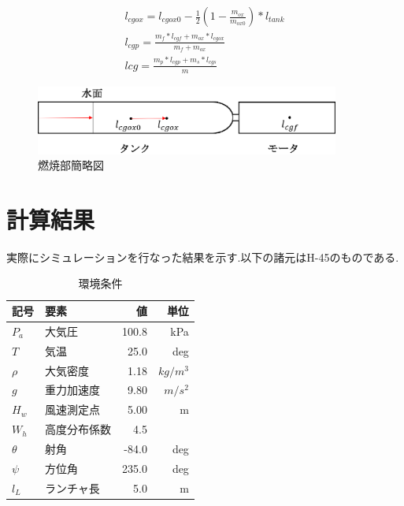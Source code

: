 \documentclass[a4paper]{jarticle}
\begin{document}
\begin{eqnarray}
  l_{cgox} = l_{cgox0} - \frac{1}{2}(1 - \frac{m_{ox}}{m_{ox0}}) * l_{tank} \\
  l_{cgp} = \frac{m_f * l_{cgf} + m_{ox} * l_{cgox}}{m_f + m_{ox}} \\
  lcg = \frac{m_p * l_{cgp} + m_s * l_{cgs}}{m}
\end{eqnarray}

\begin{figure}[htbp]
  \centering
  \includegraphics[width=100mm]{figure3.eps}
  \caption{燃焼部簡略図}
\end{figure}
\section{計算結果}
実際にシミュレーションを行なった結果を示す.以下の諸元はH-45のものである.

\begin{table}[H]
  \centering
  \begin{tabular}{|l|l|r|r|} \hline
    記号 & 要素　& 値 & 単位 \\ \hline
    $P_a$ & 大気圧 & 100.8 & kPa \\ \hline
    $T$ & 気温 & 25.0 & deg \\ \hline
    $\rho$ & 大気密度 & 1.18 & $kg/m^3$ \\ \hline
    $g$ & 重力加速度 & 9.80 & $m/s^2$ \\ \hline
    $H_w$ & 風速測定点 & 5.00 & m \\ \hline
    $W_h$ & 高度分布係数 & 4.5 & \\ \hline
    $\theta$ & 射角 & -84.0 & deg \\ \hline
    $\psi$ & 方位角 & 235.0 & deg \\ \hline
    $l_L$ & ランチャ長 & 5.0 & m \\ \hline
  \end{tabular}
  \caption{環境条件}
\end{table}
\end{document}
